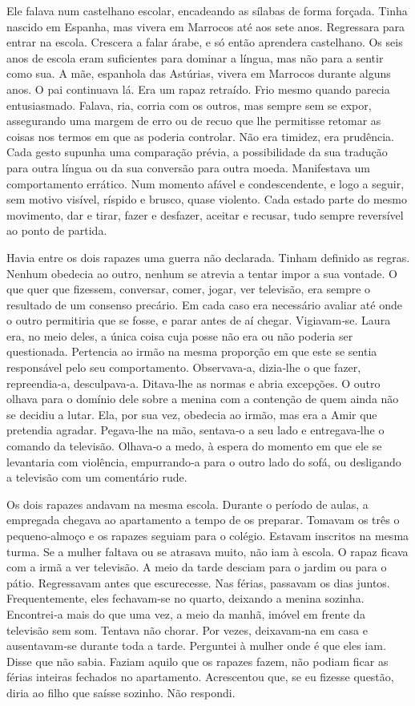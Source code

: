 Ele falava num castelhano escolar, encadeando as sílabas de forma
forçada. Tinha nascido em Espanha, mas vivera em Marrocos até aos sete
anos. Regressara para entrar na escola. Crescera a falar árabe, e só
então aprendera castelhano. Os seis anos de escola eram suficientes para
dominar a língua, mas não para a sentir como sua. A mãe, espanhola das
Astúrias, vivera em Marrocos durante alguns anos. O pai continuava lá.
Era um rapaz retraído. Frio mesmo quando parecia entusiasmado. Falava,
ria, corria com os outros, mas sempre sem se expor, assegurando uma
margem de erro ou de recuo que lhe permitisse retomar as coisas nos
termos em que as poderia controlar. Não era timidez, era prudência. Cada
gesto supunha uma comparação prévia, a possibilidade da sua tradução
para outra língua ou da sua conversão para outra moeda. Manifestava um
comportamento errático. Num momento afável e condescendente, e logo a
seguir, sem motivo visível, ríspido e brusco, quase violento. Cada
estado parte do mesmo movimento, dar e tirar, fazer e desfazer, aceitar
e recusar, tudo sempre reversível ao ponto de partida.

Havia entre os dois rapazes uma guerra não declarada. Tinham definido as
regras. Nenhum obedecia ao outro, nenhum se atrevia a tentar impor a sua
vontade. O que quer que fizessem, conversar, comer, jogar, ver
televisão, era sempre o resultado de um consenso precário. Em cada caso
era necessário avaliar até onde o outro permitiria que se fosse, e parar
antes de aí chegar. Vigiavam­‑se. Laura era, no meio deles, a única
coisa cuja posse não era ou não poderia ser questionada. Pertencia ao
irmão na mesma proporção em que este se sentia responsável pelo seu
comportamento. Observava­‑a, dizia­‑lhe o que fazer, repreendia­‑a,
desculpava­‑a. Ditava­‑lhe as normas e abria excepções. O outro olhava
para o domínio dele sobre a menina com a contenção de quem ainda não se
decidiu a lutar. Ela, por sua vez, obedecia ao irmão, mas era a Amir que
pretendia agradar. Pegava­‑lhe na mão, sentava­‑o a seu lado e
entregava­‑lhe o comando da televisão. Olhava­‑o a medo, à espera do
momento em que ele se levantaria com violência, empurrando­‑a para o
outro lado do sofá, ou desligando a televisão com um comentário rude.

Os dois rapazes andavam na mesma escola. Durante o período de aulas, a
empregada chegava ao apartamento a tempo de os preparar. Tomavam os três
o pequeno­‑almoço e os rapazes seguiam para o colégio. Estavam inscritos
na mesma turma. Se a mulher faltava ou se atrasava muito, não iam à
escola. O rapaz ficava com a irmã a ver televisão. A meio da tarde
desciam para o jardim ou para o pátio. Regressavam antes que
escurecesse. Nas férias, passavam os dias juntos. Frequentemente, eles
fechavam­‑se no quarto, deixando a menina sozinha. Encontrei­‑a mais do
que uma vez, a meio da manhã, imóvel em frente da televisão sem som.
Tentava não chorar. Por vezes, deixavam­‑na em casa e ausentavam­‑se
durante toda a tarde. Perguntei à mulher onde é que eles iam. Disse que
não sabia. Faziam aquilo que os rapazes fazem, não podiam ficar as
férias inteiras fechados no apartamento. Acrescentou que, se eu fizesse
questão, diria ao filho que saísse sozinho. Não respondi.

